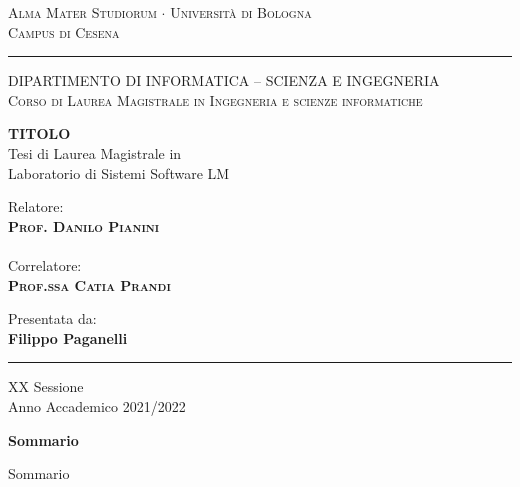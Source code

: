 \documentclass[12pt,a4paper]{report}
\begin{document}
  
\begin{titlepage}
\begin{center}
{{\Large{\textsc{Alma Mater Studiorum $\cdot$ Universit\`a di
Bologna\\\vspace{2mm}Campus di Cesena}}}} \rule[0.1cm]{15.8cm}{0.2mm}

{\small{\textsc { DIPARTIMENTO DI INFORMATICA – SCIENZA E INGEGNERIA \\
\vspace{3mm}
Corso di Laurea Magistrale in Ingegneria e scienze informatiche}}}
\end{center}
\vspace{15mm}
\begin{center}
{\LARGE\textbf{TITOLO}}\\
\vspace{20mm} {\large{\sc Tesi di Laurea Magistrale in\\ Laboratorio di Sistemi Software LM}}
\end{center}
\vfill
\par
\noindent

\begin{minipage}[t]{0.47\textwidth}
{\large{\sc Relatore:}\\
{\bf \textsc{Prof. Danilo Pianini}}}\\ \\
{\large{\sc Correlatore:}\\
{\bf \textsc{Prof.ssa Catia Prandi}}}\\
\vskip 8pt
\end{minipage}
\hfill
\begin{minipage}[t]{0.47\textwidth}\raggedleft
{\large{\sc Presentata da:}\\
{\bf Filippo Paganelli}}
\end{minipage}
\vspace{20mm}
\begin{center}
\rule[0.1cm]{15.8cm}{0.2mm}
{\large{\sc XX Sessione\\
Anno Accademico 2021/2022}}
\end{center}
\end{titlepage}

\newpage

\begin{center}
{\LARGE{\bf Sommario}}
\end{center}
{
\noindent
Sommario
}

\newpage
\end{document}

